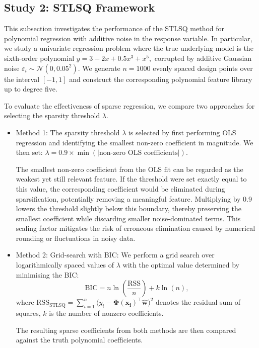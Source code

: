 \subsection{Study 2: STLSQ Framework}
\label{subsec:STLSQ}
This subsection investigates the performance of the STLSQ method for polynomial regression with additive noise in the response variable. In particular, we study a univariate regression problem where the true underlying model is the sixth-order polynomial $y = 3 - 2x + 0.5x^3 + x^5,$
corrupted by additive Gaussian noise $\varepsilon_i \sim \mathcal{N}(0, 0.05^2)$. We generate $n=1000$ evenly spaced design points over the interval $[-1,1]$ and construct the corresponding polynomial feature library up to degree five. 

To evaluate the effectiveness of sparse regression, we compare two approaches for selecting the sparsity threshold $\lambda$. \begin{itemize}
\item Method 1: The sparsity threshold $\lambda$ is selected by first performing OLS regression and identifying the smallest non-zero coefficient in magnitude. We then set:
$\lambda = 0.9 \times \min(|\text{non-zero OLS coefficients}|).$

The smallest non-zero coefficient from the OLS fit can be regarded as the weakest yet still relevant feature. If the threshold were set exactly equal to this value, the corresponding coefficient would be eliminated during sparsification, potentially removing a meaningful feature. Multiplying by 0.9 lowers the threshold slightly below this boundary, thereby preserving the smallest coefficient while discarding smaller noise-dominated terms. This scaling factor mitigates the risk of erroneous elimination caused by numerical rounding or fluctuations in noisy data.
\item Method 2: Grid-search with BIC: 
We perform a grid search over logarithmically spaced values of $\lambda$ with the optimal value determined by minimising the BIC:
\begin{equation}
    \mathrm{BIC} = n \ln\!\left(\frac{\mathrm{RSS}}{n}\right) + k \ln(n),
\end{equation}
where $\mathrm{RSS}_{\text{STLSQ}}
= \sum_{i=1}^{n}\bigl(y_i - \mathbf{\Phi}(\boldsymbol{x_i})^\top \widehat{\boldsymbol{w}}\bigr)^2$ denotes the residual sum of squares, $k$ is the number of nonzero coefficients. 

The resulting sparse coefficients from both methods are then compared against the truth polynomial coefficients.
\end{itemize}




